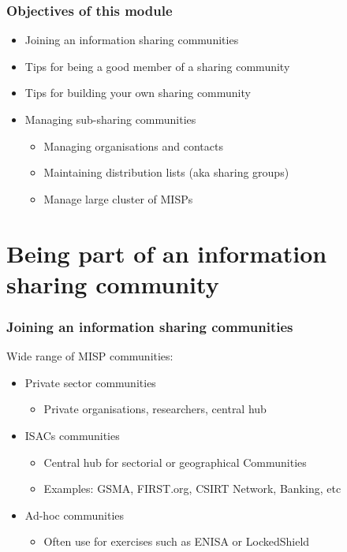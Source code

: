 
\begin{frame}[t,plain]
    \titlepage
\end{frame}

\begin{frame}
    \frametitle{Objectives of this module}
    \begin{itemize}
        \item Joining an information sharing communities
        \item Tips for being a good member of a sharing community
        \item Tips for building your own sharing community
        \item Managing sub-sharing communities
        \begin{itemize}
            \item Managing organisations and contacts
            \item Maintaining distribution lists (aka sharing groups)
            \item Manage large cluster of MISPs
        \end{itemize}
    \end{itemize}
\end{frame}

\section{Being part of an information sharing community}
\begin{frame}
    \frametitle{Joining an information sharing communities}
    Wide range of MISP communities:
    \begin{itemize}
        \item Private sector communities
        \begin{itemize}
            \item Private organisations, researchers, central hub
        \end{itemize}
        \item ISACs communities
        \begin{itemize}
            \item Central hub for sectorial or geographical Communities
            \item Examples: GSMA, FIRST.org, CSIRT Network, Banking, etc
        \end{itemize}
        \item Ad-hoc communities
        \begin{itemize}
            \item Often use for exercises such as ENISA or LockedShield
        \end{itemize}
    \end{itemize}
\end{frame}

